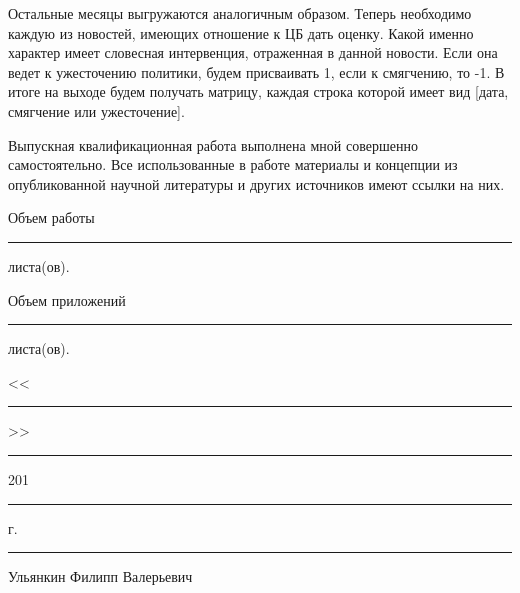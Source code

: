 \documentclass[14pt,a4paper, oneside]{extreport}
\theoremstyle{plain}              %
\theoremstyle{definition}         %
\begin{document}
Остальные месяцы выгружаются аналогичным образом. Теперь необходимо каждую из новостей, имеющих отношение к ЦБ дать оценку. Какой именно характер имеет словесная интервенция, отраженная в данной новости. Если она ведет к ужесточению политики, будем присваивать 1, если к смягчению, то -1. В итоге на выходе будем получать матрицу, каждая строка которой имеет вид [дата, смягчение или ужесточение].

\newpage
Выпускная квалификационная работа выполнена мной совершенно самостоятельно. Все использованные в работе материалы и концепции из опубликованной научной литературы и других источников имеют ссылки на них.

\vspace{2ex}

\noindent Объем работы  \rule{3em}{0.5pt} листа(ов).

\vspace{2ex}

\noindent Объем приложений \rule{3em}{0.5pt} листа(ов).

\vspace{4ex}

\noindent <<\rule{2em}{0.5pt}>> \rule{5em}{0.5pt} 201\rule{1em}{0.5pt} г. 

\vspace{4ex}

\noindent \rule{10em}{0.5pt} Ульянкин Филипп Валерьевич
\end{document}

